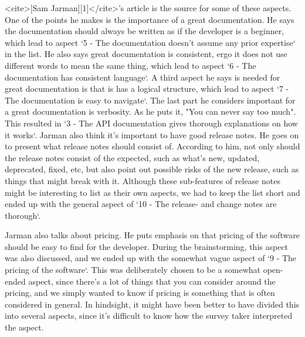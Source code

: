 \documentclass{article}
\begin{document}
<cite>[Sam Jarman][1]</cite>'s article is the source for some of these
aspects. One of the points he makes is the importance of a great documentation.
He says the documentation should always be written as if the developer is
a beginner, which lead to aspect `5 - The documentation doesn't assume any prior expertise` in the list.
He also says great documentation is consistent, ergo it does not use different
words to mean the same thing, which lead to aspect `6 - The documentation has consistent language`.
A third aspect he says is needed for great documentation is that is has a
logical structure, which lead to aspect `7 - The documentation is easy to navigate`.
The last part he considers important for a great documentation is verbosity.
As he puts it, "You can never say too much". This resulted in `3 - The API documentation gives thorough explanations on how it works`.
Jarman also think it's important to have good release notes. He goes on
to present what release notes should consist of. According to him, not
only should the release notes consist of the expected, such as what's new,
updated, deprecated, fixed, etc, but also point out possible risks of the new release,
such as things that might break with it. Although these sub-features of release notes
might be interesting to list as their own aspects, we had to keep the list short
and ended up with the general aspect of `10 - The release- and change notes are thorough`.

Jarman also talks about pricing. He puts emphasis on that pricing of the software
should be easy to find for the developer. During the brainstorming, this
aspect was also discussed, and we ended up with the somewhat vague
aspect of `9 - The pricing of the software`. This was deliberately chosen
to be a somewhat open-ended aspect, since there's a lot of things that you can
consider around the pricing, and we simply wanted to know if pricing is something
that is often considered in general. In hindsight, it might have been better to have
divided this into several aspects, since it's difficult to know how the
survey taker interpreted the aspect.
\end{document}
